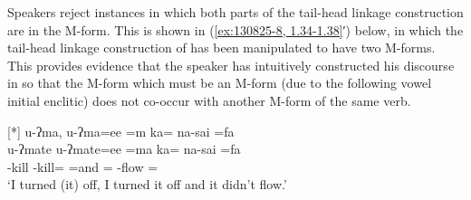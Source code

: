 \begin{exe}
	\label{ex:130825-8, 1.34-1.38}
	\begin{xlist}
	\end{xlist}
\end{exe}

Speakers reject instances in which both parts of the
tail-head linkage construction are in the M-form.
This is shown in (\ref{ex:130825-8, 1.34-1.38}′) below,
in which the tail-head linkage construction of 
has been manipulated to have two M-forms.
This provides evidence that the speaker has intuitively
constructed his discourse in 
so that the M-form which must be an M-form (due to
the following vowel initial enclitic) does not
co-occur with another M-form of the same verb.

\begin{exe}
	{\glll	
								u-ʔma, u-ʔma=ee =m ka= na-sai =fa \\
								u-ʔmate u-ʔmate=ee =ma ka= na-sai =fa\\
								{\qu}-kill{\tbrM} {\qu}-kill{\tbrMv}={\eeV} =and {\ka}= \na-flow ={\fa}\\
				\glt	`I turned (it) off, I turned it off and it didn't flow.' }
\end{exe}

